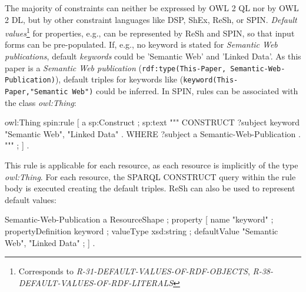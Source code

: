 \documentclass{llncs}
\newcommand{\ms}[1]{\texttt{#1}}
\begin{document}
The majority of constraints can neither be expressed by OWL 2 QL nor by OWL 2 DL, but by other constraint languages like DSP, ShEx, ReSh, or SPIN.
{\em Default values}\footnote{Corresponds to {\em R-31-DEFAULT-VALUES-OF-RDF-OBJECTS}, {\em R-38-DEFAULT-VALUES-OF-RDF-LITERALS}}
for properties, e.g., can be represented by ReSh and SPIN,
so that input forms can be pre-populated. %
If, e.g., no keyword is stated for \emph{Semantic Web publications}, default \emph{keywords} could be 'Semantic Web' and 'Linked Data'.
As this paper is a \emph{Semantic Web publication} (\ms{rdf:type(This-Paper, Semantic-Web-Publication)}), 
default triples for keywords like (\ms{keyword(This-} \ms{Paper,"Semantic Web")} could be inferred.
In SPIN, rules can be associated with the class {\em owl:Thing}:
\begin{ex}
owl:Thing spin:rule [ a sp:Construct ; sp:text """
    CONSTRUCT { ?subject keyword "Semantic Web", "Linked Data" . }
    WHERE { ?subject a Semantic-Web-Publication . } """ ; ] .
\end{ex}
This rule is applicable for each resource, as each resource is implicitly of the type {\em owl:Thing}. 
For each resource, the SPARQL CONSTRUCT query within the rule body is executed creating the default triples.
ReSh can also be used to represent default values:
\begin{ex}
Semantic-Web-Publication a ResourceShape ; property [
    name "keyword" ; propertyDefinition keyword ; valueType xsd:string ;
    defaultValue "Semantic Web", "Linked Data" ; ] .
\end{ex}
\end{document}

